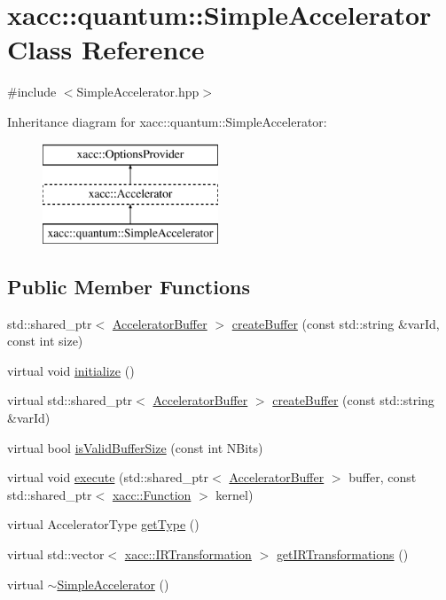 \hypertarget{a00123}{}\section{xacc\+:\+:quantum\+:\+:Simple\+Accelerator Class Reference}
\label{a00123}


{\ttfamily \#include $<$Simple\+Accelerator.\+hpp$>$}

Inheritance diagram for xacc\+:\+:quantum\+:\+:Simple\+Accelerator\+:\begin{figure}[H]
\begin{center}
\leavevmode
\includegraphics[height=3.000000cm]{a00123}
\end{center}
\end{figure}
\subsection*{Public Member Functions}
\begin{DoxyCompactItemize}
\item 
std\+::shared\+\_\+ptr$<$ \hyperlink{a00019}{Accelerator\+Buffer} $>$ \hyperlink{a00123_adb9393692e9f484df241aa5d014030d1}{create\+Buffer} (const std\+::string \&var\+Id, const int size)
\item 
virtual void \hyperlink{a00123_a392e3b30523f5f681127e7e98887108c}{initialize} ()
\item 
virtual std\+::shared\+\_\+ptr$<$ \hyperlink{a00019}{Accelerator\+Buffer} $>$ \hyperlink{a00123_a46445d77d4b8ad2689571d0db6604380}{create\+Buffer} (const std\+::string \&var\+Id)
\item 
virtual bool \hyperlink{a00123_a60b9db2d6aed235857c45413a070338e}{is\+Valid\+Buffer\+Size} (const int N\+Bits)
\item 
virtual void \hyperlink{a00123_a3089b15fbbaa83abf2941bd3b8d2d3c6}{execute} (std\+::shared\+\_\+ptr$<$ \hyperlink{a00019}{Accelerator\+Buffer} $>$ buffer, const std\+::shared\+\_\+ptr$<$ \hyperlink{a00059}{xacc\+::\+Function} $>$ kernel)
\item 
virtual Accelerator\+Type \hyperlink{a00123_ad76eeb0bbd7de21aad5bd20d20970a98}{get\+Type} ()
\item 
virtual std\+::vector$<$ \hyperlink{a00078}{xacc\+::\+I\+R\+Transformation} $>$ \hyperlink{a00123_afc49c9e7973ba6c6ff9761c36198323d}{get\+I\+R\+Transformations} ()
\item 
virtual \hyperlink{a00123_a7ff286def924fafdff2066d12858e60c}{$\sim$\+Simple\+Accelerator} ()
\end{DoxyCompactItemize}
